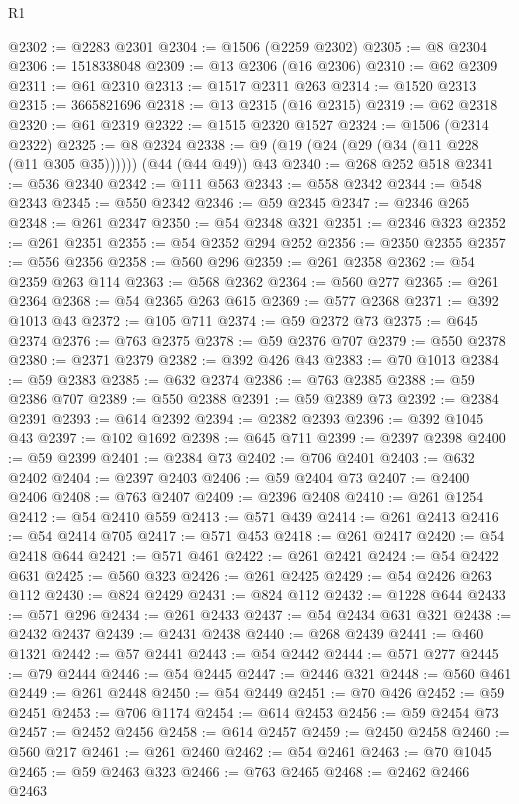 \begin{lexlean}{R1}
\begin{coremodule}
@2302 := @2283 @2301
@2304 := @1506 (@2259 @2302)
@2305 := @8 @2304
@2306 := 1518338048
@2309 := @13 @2306 (@16 @2306)
@2310 := @62 @2309
@2311 := @61 @2310
@2313 := @1517 @2311 @263
@2314 := @1520 @2313
@2315 := 3665821696
@2318 := @13 @2315 (@16 @2315)
@2319 := @62 @2318
@2320 := @61 @2319
@2322 := @1515 @2320 @1527
@2324 := @1506 (@2314 @2322)
@2325 := @8 @2324
@2338 := @9 (@19 (@24 (@29 (@34 (@11 @228 (@11 @305 @35)))))) (@44 (@44 @49)) @43
@2340 := @268 @252 @518
@2341 := @536 @2340
@2342 := @111 @563
@2343 := @558 @2342
@2344 := @548 @2343
@2345 := @550 @2342
@2346 := @59 @2345
@2347 := @2346 @265
@2348 := @261 @2347
@2350 := @54 @2348 @321
@2351 := @2346 @323
@2352 := @261 @2351
@2355 := @54 @2352 @294 @252
@2356 := @2350 @2355
@2357 := @556 @2356
@2358 := @560 @296
@2359 := @261 @2358
@2362 := @54 @2359 @263 @114
@2363 := @568 @2362
@2364 := @560 @277
@2365 := @261 @2364
@2368 := @54 @2365 @263 @615
@2369 := @577 @2368
@2371 := @392 @1013 @43
@2372 := @105 @711
@2374 := @59 @2372 @73
@2375 := @645 @2374
@2376 := @763 @2375
@2378 := @59 @2376 @707
@2379 := @550 @2378
@2380 := @2371 @2379
@2382 := @392 @426 @43
@2383 := @70 @1013
@2384 := @59 @2383
@2385 := @632 @2374
@2386 := @763 @2385
@2388 := @59 @2386 @707
@2389 := @550 @2388
@2391 := @59 @2389 @73
@2392 := @2384 @2391
@2393 := @614 @2392
@2394 := @2382 @2393
@2396 := @392 @1045 @43
@2397 := @102 @1692
@2398 := @645 @711
@2399 := @2397 @2398
@2400 := @59 @2399
@2401 := @2384 @73
@2402 := @706 @2401
@2403 := @632 @2402
@2404 := @2397 @2403
@2406 := @59 @2404 @73
@2407 := @2400 @2406
@2408 := @763 @2407
@2409 := @2396 @2408
@2410 := @261 @1254
@2412 := @54 @2410 @559
@2413 := @571 @439
@2414 := @261 @2413
@2416 := @54 @2414 @705
@2417 := @571 @453
@2418 := @261 @2417
@2420 := @54 @2418 @644
@2421 := @571 @461
@2422 := @261 @2421
@2424 := @54 @2422 @631
@2425 := @560 @323
@2426 := @261 @2425
@2429 := @54 @2426 @263 @112
@2430 := @824 @2429
@2431 := @824 @112
@2432 := @1228 @644
@2433 := @571 @296
@2434 := @261 @2433
@2437 := @54 @2434 @631 @321
@2438 := @2432 @2437
@2439 := @2431 @2438
@2440 := @268 @2439
@2441 := @460 @1321
@2442 := @57 @2441
@2443 := @54 @2442
@2444 := @571 @277
@2445 := @79 @2444
@2446 := @54 @2445
@2447 := @2446 @321
@2448 := @560 @461
@2449 := @261 @2448
@2450 := @54 @2449
@2451 := @70 @426
@2452 := @59 @2451
@2453 := @706 @1174
@2454 := @614 @2453
@2456 := @59 @2454 @73
@2457 := @2452 @2456
@2458 := @614 @2457
@2459 := @2450 @2458
@2460 := @560 @217
@2461 := @261 @2460
@2462 := @54 @2461
@2463 := @70 @1045
@2465 := @59 @2463 @323
@2466 := @763 @2465
@2468 := @2462 @2466 @2463

\end{coremodule}
\end{lexlean}
